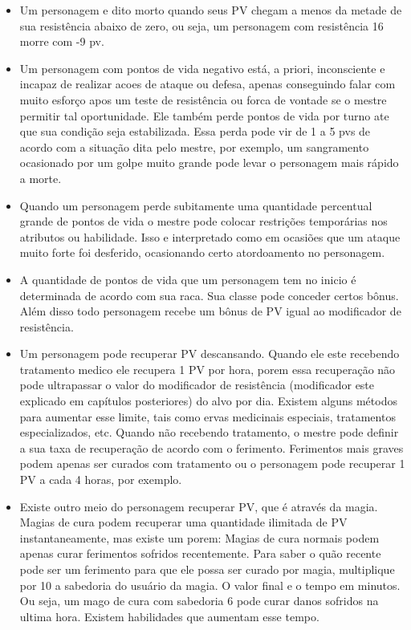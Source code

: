 \begin{itemize}
\begin{itemize}
\item Um personagem e dito morto quando seus PV chegam a menos da metade de sua resistência abaixo de zero, ou seja, um personagem com resistência 16 morre com -9 pv. 
\item Um personagem com pontos de vida negativo está, a priori, inconsciente e incapaz de realizar acoes de ataque ou defesa, apenas conseguindo falar com muito esforço apos um teste de resistência ou forca de vontade se o mestre permitir tal oportunidade. Ele também perde pontos de vida por turno ate que sua condição seja estabilizada. Essa perda pode vir de 1 a 5 pvs de acordo com a situação dita pelo mestre, por exemplo, um sangramento ocasionado por um golpe muito grande pode levar o personagem mais rápido a morte. 
\item Quando um personagem perde subitamente uma quantidade percentual grande de pontos de vida o mestre pode colocar restrições temporárias nos atributos ou habilidade. Isso e interpretado como em ocasiões que um ataque muito forte foi desferido, ocasionando certo atordoamento no personagem.
\item A quantidade de pontos de vida que um personagem tem no inicio é determinada de acordo com sua raca. Sua classe pode conceder certos bônus. Além disso todo personagem recebe um bônus de PV igual ao modificador de resistência.
\item Um personagem pode recuperar PV descansando. Quando ele este recebendo tratamento medico ele recupera 1 PV por hora, porem essa recuperação não pode ultrapassar o valor do modificador de resistência (modificador este explicado em capítulos posteriores) do alvo por dia. Existem alguns métodos para aumentar esse limite, tais como ervas medicinais especiais, tratamentos especializados, etc. Quando não recebendo tratamento, o mestre pode definir a sua taxa de recuperação de acordo com o ferimento. Ferimentos mais graves podem apenas ser curados com tratamento ou o personagem pode recuperar 1 PV a cada 4 horas, por exemplo.
\item Existe outro meio do personagem recuperar PV, que é através da magia. Magias de cura podem recuperar uma quantidade ilimitada de PV instantaneamente, mas existe um porem: Magias de cura normais podem apenas curar ferimentos sofridos recentemente. Para saber o quão recente pode ser um ferimento para que ele possa ser curado por magia, multiplique por 10 a sabedoria do usuário da magia. O valor final e o tempo em minutos. Ou seja, um mago de cura com sabedoria 6 pode curar danos sofridos na ultima hora. Existem habilidades que aumentam esse tempo. 

\end{itemize}
\end{itemize}
